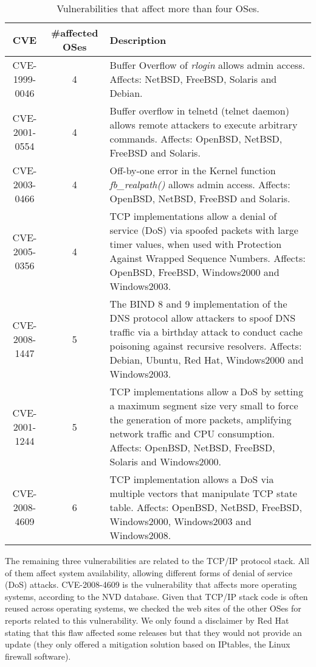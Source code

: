 \begin{table}[!ht]
\caption{Vulnerabilities that affect more than four OSes.}
\label{tab:spreaded_vulns}
\begin{center}
{\scriptsize
\begin{tabular}{|c||c| p{} | }\hline
\textbf{CVE} & \#affected OSes  & Description  \\\hline\hline
CVE-1999-0046  &  4  & Buffer Overflow of \emph{rlogin} allows admin access. Affects: NetBSD, FreeBSD, Solaris and Debian. \\ \hline
CVE-2001-0554  &  4  & Buffer overflow in telnetd (telnet daemon) allows remote attackers to execute arbitrary commands. Affects: OpenBSD, NetBSD, FreeBSD and Solaris.  \\ \hline
CVE-2003-0466  &  4  & Off-by-one error in the Kernel function \emph{fb\_realpath()} allows admin access. Affects: OpenBSD, NetBSD, FreeBSD and Solaris.  \\ \hline
CVE-2005-0356  &  4  & TCP implementations allow a denial of service (DoS) via spoofed packets with large timer values, when used with Protection Against Wrapped Sequence Numbers. Affects: OpenBSD, FreeBSD, Windows2000 and Windows2003. \\ \hline
CVE-2008-1447  &  5  & The BIND 8 and 9 implementation of the DNS protocol allow attackers to spoof DNS traffic via a birthday attack to conduct cache poisoning against recursive resolvers. Affects: Debian, Ubuntu, Red Hat, Windows2000 and Windows2003.  \\ \hline
CVE-2001-1244  &  5  & TCP implementations allow a DoS by setting a maximum segment size very small to force the generation of more packets, amplifying network traffic and CPU consumption. Affects: OpenBSD, NetBSD, FreeBSD, Solaris and Windows2000. \\ \hline
CVE-2008-4609  &  6  & TCP implementation allows a DoS via multiple vectors that manipulate TCP state table. Affects: OpenBSD, NetBSD, FreeBSD, Windows2000, Windows2003 and Windows2008.   \\ \hline
\end{tabular}
}
\end{center}
\end{table}


The remaining three vulnerabilities are related to the TCP/IP protocol stack. All of them affect system availability, allowing different forms of denial of service (DoS) attacks. CVE-2008-4609 is the vulnerability that affects more operating systems, according to the NVD database. Given that TCP/IP stack code is often reused across operating systems, we checked the web sites of the other OSes for reports related to this vulnerability. We only found a disclaimer by Red Hat~\cite{RH-CVE-2008-4609} stating that this flaw affected some releases but that they would not provide an update (they only offered a mitigation solution based on IPtables, the Linux firewall software).

